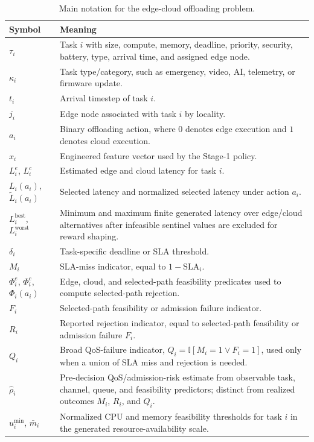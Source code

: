 \begin{table}[!t]
\centering
\caption{Main notation for the edge-cloud offloading problem.}
\label{tab:problem_notation}
\scriptsize
\begin{tabularx}{\textwidth}{@{}lX@{}}
\toprule
Symbol & Meaning \\
\midrule
$\tau_i$ & Task $i$ with size, compute, memory, deadline, priority, security, battery, type, arrival time, and assigned edge node. \\
$\kappa_i$ & Task type/category, such as emergency, video, AI, telemetry, or firmware update. \\
$t_i$ & Arrival timestep of task $i$. \\
$j_i$ & Edge node associated with task $i$ by locality. \\
$a_i$ & Binary offloading action, where $0$ denotes edge execution and $1$ denotes cloud execution. \\
$x_i$ & Engineered feature vector used by the Stage-1 policy. \\
$L_i^e$, $L_i^c$ & Estimated edge and cloud latency for task $i$. \\
$L_i(a_i)$, $\tilde{L}_i(a_i)$ & Selected latency and normalized selected latency under action $a_i$. \\
$L_i^{\mathrm{best}}$, $L_i^{\mathrm{worst}}$ & Minimum and maximum finite generated latency over edge/cloud alternatives after infeasible sentinel values are excluded for reward shaping. \\
$\delta_i$ & Task-specific deadline or SLA threshold. \\
$M_i$ & SLA-miss indicator, equal to $1-\mathrm{SLA}_i$. \\
$\Phi_i^e$, $\Phi_i^c$, $\Phi_i(a_i)$ & Edge, cloud, and selected-path feasibility predicates used to compute selected-path rejection. \\
$F_i$ & Selected-path feasibility or admission failure indicator. \\
$R_i$ & Reported rejection indicator, equal to selected-path feasibility or admission failure $F_i$. \\
$Q_i$ & Broad QoS-failure indicator, $Q_i=\mathbb{I}[M_i=1\lor F_i=1]$, used only when a union of SLA miss and rejection is needed. \\
$\hat{\rho}_i$ & Pre-decision QoS/admission-risk estimate from observable task, channel, queue, and feasibility predictors; distinct from realized outcomes $M_i$, $R_i$, and $Q_i$. \\
$u_i^{\min}$, $\bar{m}_i$ & Normalized CPU and memory feasibility thresholds for task $i$ in the generated resource-availability scale. \\

\end{tabularx}
\end{table}
